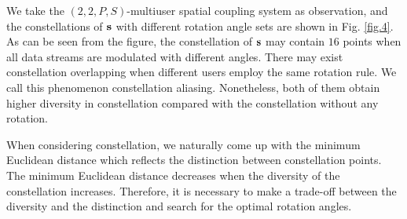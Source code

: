 \documentclass[conference]{IEEEtran}
\begin{document}
We take the $(2,2,P,S)$-multiuser spatial coupling system as observation, and the constellations of ${\bf{s}}$ with different rotation angle sets are shown in Fig. \ref{fig.4}. As can be seen from the figure, the constellation of ${\bf{s}}$ may contain $16$ points when all data streams are modulated with different angles. There may exist constellation overlapping when different users employ the same rotation rule. We call this phenomenon constellation aliasing. Nonetheless, both of them obtain higher diversity in constellation compared with the constellation without any rotation.

When considering constellation, we naturally come up with the minimum Euclidean distance which reflects the distinction between constellation points. The minimum Euclidean distance decreases when the diversity of the constellation increases. Therefore, it is necessary to make a trade-off between the diversity and the distinction and search for the optimal rotation angles.
\end{document}
